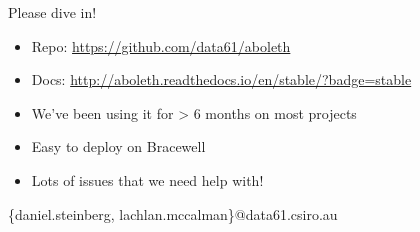 \documentclass[lualatex, aspectratio=169]{beamer}
\begin{document}
\begin{frame}{Please dive in!}

  \begin{itemize}
    \item Repo: \url{https://github.com/data61/aboleth}
    \item Docs: \url{http://aboleth.readthedocs.io/en/stable/?badge=stable}
    \item We've been using it for > 6 months on most projects
    \item Easy to deploy on Bracewell
    \item Lots of issues that we need help with!
  \end{itemize}

  \hspace{2cm}


  \hspace{2cm}

  \{daniel.steinberg, lachlan.mccalman\}@data61.csiro.au

\end{frame}
\end{document}
